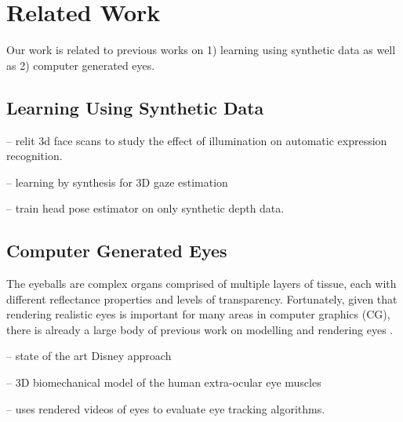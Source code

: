 
\section{Related Work}

Our work is related to previous works on 1) learning using synthetic data as well as 2) computer generated eyes.

\subsection{Learning Using Synthetic Data}

\cite{stratou2011effect} -- relit 3d face scans to study the effect of illumination on automatic expression recognition.

\cite{sugano2014learning} -- learning by synthesis for 3D gaze estimation

\cite{fanelli2011real} -- train head pose estimator on only synthetic depth data.

\subsection{Computer Generated Eyes}

The eyeballs are complex organs comprised of multiple layers of tissue, each with different reflectance properties and levels of transparency.
Fortunately, given that rendering realistic eyes is important for many areas in computer graphics (CG), there is already a large body of previous work on modelling and rendering eyes \cite{ruhland2014look}.

\cite{berard2014highquality} -- state of the art Disney approach


\cite{priamikov14_openeyesim} -- 3D biomechanical model of the human extra-ocular eye muscles

\cite{swirski2014rendering} -- uses rendered videos of eyes to evaluate eye tracking algorithms.




